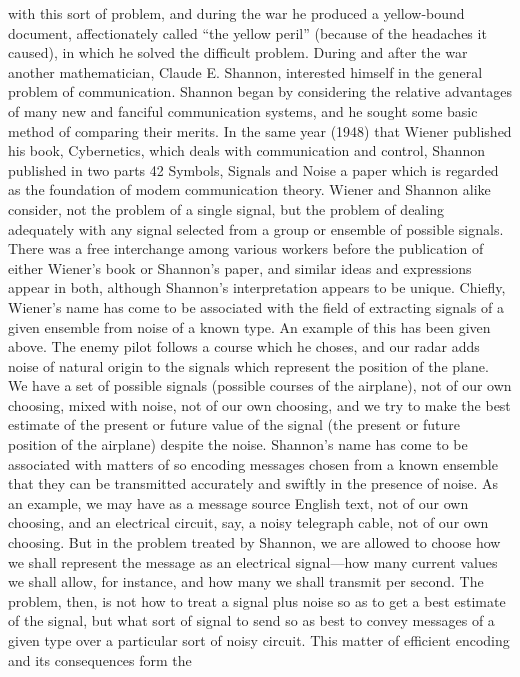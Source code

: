 with this sort of problem, and during the war he produced a
yellow-bound document, affectionately called “the yellow peril”
(because of the headaches it caused), in which he solved the difficult
problem.
During and after the war another mathematician, Claude E.
Shannon, interested himself in the general problem of communication.
Shannon began by considering the relative advantages of
many new and fanciful communication systems, and he sought
some basic method of comparing their merits. In the same year
(1948) that Wiener published his book, Cybernetics, which deals
with communication and control, Shannon published in two parts
42 Symbols, Signals and Noise
a paper which is regarded as the foundation of modem communication
theory.
Wiener and Shannon alike consider, not the problem of a single
signal, but the problem of dealing adequately with any signal
selected from a group or ensemble of possible signals. There was
a free interchange among various workers before the publication
of either Wiener’s book or Shannon’s paper, and similar ideas and
expressions appear in both, although Shannon’s interpretation
appears to be unique.
Chiefly, Wiener’s name has come to be associated with the field
of extracting signals of a given ensemble from noise of a known
type. An example of this has been given above. The enemy pilot
follows a course which he choses, and our radar adds noise of
natural origin to the signals which represent the position of the
plane. We have a set of possible signals (possible courses of the
airplane), not of our own choosing, mixed with noise, not of our
own choosing, and we try to make the best estimate of the present
or future value of the signal (the present or future position of the
airplane) despite the noise.
Shannon’s name has come to be associated with matters of so
encoding messages chosen from a known ensemble that they can
be transmitted accurately and swiftly in the presence of noise. As
an example, we may have as a message source English text, not
of our own choosing, and an electrical circuit, say, a noisy telegraph
cable, not of our own choosing. But in the problem treated by
Shannon, we are allowed to choose how we shall represent the
message as an electrical signal—how many current values we shall
allow, for instance, and how many we shall transmit per second.
The problem, then, is not how to treat a signal plus noise so as to
get a best estimate of the signal, but what sort of signal to send
so as best to convey messages of a given type over a particular sort
of noisy circuit.
This matter of efficient encoding and its consequences form the
